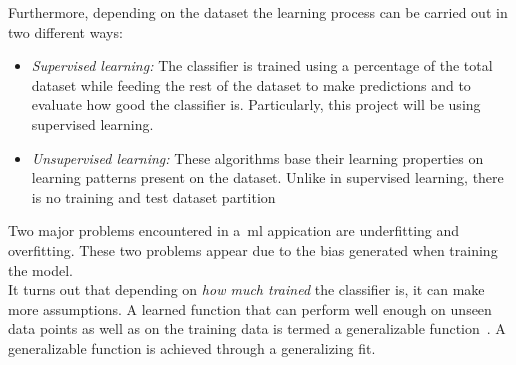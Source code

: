 Furthermore, depending on the dataset the learning process can be carried out in two different ways:
\begin{itemize}
	\item \textit{Supervised learning:} \label{ml:super}The classifier is trained using a percentage of the total dataset while feeding the rest of the dataset to make predictions and to evaluate how good the classifier is. Particularly, this project will be using supervised learning.
	
	\item \textit{Unsupervised learning:} These algorithms base their learning properties on learning patterns present on the dataset. Unlike in supervised learning, there is no training and test dataset partition
\end{itemize}
Two major problems encountered in a~\ac{ml} appication are underfitting and overfitting. These two problems appear due to the bias generated when training the model.\\
It turns out that depending on \textit{how much trained} the classifier is, it can make more assumptions. A learned function that can perform well enough on unseen data points as well as on the training data is termed a generalizable function~\cite{gs}. A generalizable function is achieved through a generalizing fit.
